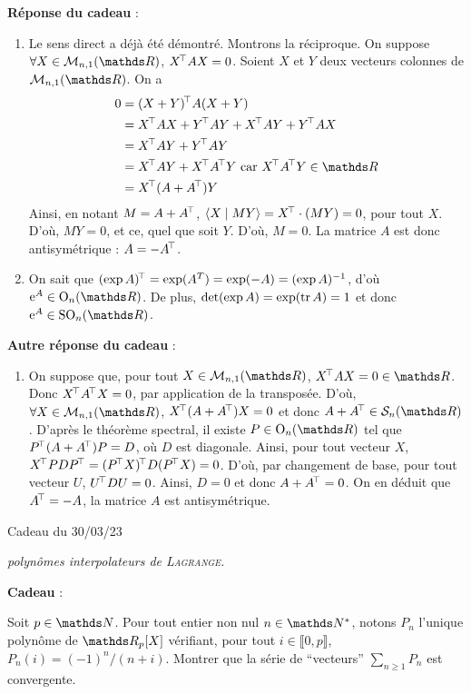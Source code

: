 \documentclass[a4paper]{article}
\begin{document}
	\bigskip\bigskip
	\textbf{Réponse du cadeau} :\\
	\begin{enumerate}
		\item Le sens direct a déjà été démontré. Montrons la réciproque.
			On suppose $\forall X \in \mathcal{M}_{n,1}(\R)$, $X^{\!\!\,\top} AX = 0$.
			Soient $X$ et $Y$ deux vecteurs colonnes de $\mathcal{M}_{n,1}(\R)$.
			On a
			\begin{align*}
				0 &= (X+Y)^\T A (X+Y)\\
					&= X^\T A X + Y^\T A Y + X^\T A Y + Y^\T A X\\
					&= X^\T A Y + Y^\T A Y\\
					&= X^\T A Y + X^\T A^\T Y \text{ car } X^\T A^\T Y \in \R\\
					&= X^\T (A + A^\T) Y \\
			\end{align*}
			Ainsi, en notant $M = A + A^{\!\!\,\top}$, $\langle X  \mid MY\rangle = X^{\!\!\,\top} \cdot (MY) = 0$, pour tout $X$.
			D'où, $MY = 0$, et ce, quel que soit $Y$. D'où, $M = 0$.
			La matrice $A$ est donc antisymétrique : $A = - A^{\!\!\,\top}$.
		\item On sait que $(\exp A)^{\!\!\,\top} = \exp(A^T) = \exp(-A) = (\exp A)^{-1}$, d'où $\mathrm{e}^A \in \mathrm{O}_n(\R)$.
			De plus, $\operatorname{det}(\exp A) = \exp(\operatorname{tr} A) = 1$ et donc $\mathrm{e}^A \in \mathrm{SO}_n(\R)$.
	\end{enumerate}

	\bigskip\bigskip
	\textbf{Autre réponse du cadeau} :\\
	\begin{enumerate}
		\item On suppose que, pour tout $X \in \mathcal{M}_{n,1}(\R)$, $X^\T A X = 0 \in \R$.
			Donc $X^{\!\!\,\top} A^{\!\!\,\top} X = 0$, par application de la transposée.
			D'où, $\forall X \in \mathcal{M}_{n,1}(\R)$, $X^{\!\!\,\top} (A + A^{\!\!\,\top}) X = 0$ et donc $A + A^\T \in \mathcal{S}_n(\R)$.
			D'après le théorème spectral, il existe $P \in \mathrm{O}_n(\R)$ tel que $P^{\!\!\,\top} (A + A^{\!\!\,\top}) P = D$, où $D$ est diagonale.
			Ainsi, pour tout vecteur $X$, $X^\T P D P^\T = (P^\T X)^\T D (P^\T X) = 0$.
			D'où, par changement de base, pour tout vecteur $U$, $U^{\!\!\,\top} D U = 0$.
			Ainsi, $D = 0$ et donc $A + A^{\!\!\,\top} = 0$.
			On en déduit que $A^{\!\!\,\top} = -A$, la matrice $A$ est antisymétrique.
	\end{enumerate}
	\clearpage
	\centerline{\LARGE Cadeau du 30/03/23}
	\centerline{\itshape polynômes interpolateurs de \textsc{Lagrange}.}

	\bigskip
	\bigskip
	\bigskip
	\textbf{Cadeau} :\\
	\begin{slshape}
		Soit $p \in \N$. Pour tout entier non nul $n \in \N^*$\!, notons $P_n$ l'unique polynôme de $\R_p[X]$ vérifiant, pour tout $i \in \llbracket 0,p \rrbracket$, $P_n(i) = (-1)^n / (n + i)$.
		Montrer que la série de ``vecteurs'' $\sum_{n \ge 1} P_n$ est convergente.
	\end{slshape}
\end{document}
